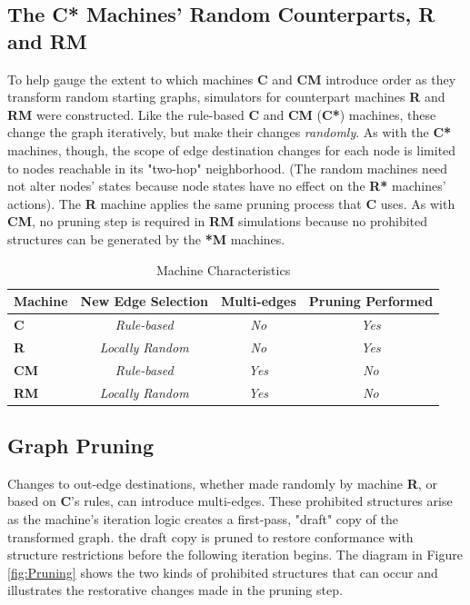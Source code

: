 \documentclass{tufte-handout}
\begin{document}
\subsection{The \textbf{C*} Machines' Random Counterparts, \textbf{R} and \textbf{RM}}

To help gauge the extent to which machines \textbf{C} and \textbf{CM}
introduce order as they transform random starting graphs, simulators for counterpart
machines \textbf{R} and \textbf{RM} were constructed. Like the rule-based \textbf{C} and
\textbf{CM} (\textbf{C*}) machines, these change the graph iteratively, but make their
changes \textit{randomly}.
As with the \textbf{C*} machines, though, the scope of edge destination changes for each node is
limited to nodes reachable in its "two-hop" neighborhood. (The random machines need not alter nodes' states
because node states have no effect on the \textbf{R*} machines' actions).
The \textbf{R} machine applies the same pruning process that \textbf{C} uses. As
with \textbf{CM}, no pruning step is required in \textbf{RM} simulations because
no prohibited structures can be generated by the \textbf{*M} machines.

\begin{table}
\caption{Machine Characteristics}
\centering
\begin{tabular}{lccc}
\toprule
Machine & New Edge Selection & Multi-edges & Pruning Performed \\
\midrule
\textbf{C} & \textit{Rule-based} & \textit{No} & \textit{Yes} \\
\textbf{R} & \textit{Locally Random} & \textit{No} & \textit{Yes} \\
\cmidrule(r){2-4}
\textbf{CM} & \textit{Rule-based} & \textit{Yes} & \textit{No} \\
\textbf{RM} & \textit{Locally Random} & \textit{Yes} & \textit{No} \\
\bottomrule
\end{tabular}
\label{tab:Tab1}
\end{table}
\vspace{3mm}

\subsection{Graph Pruning}

Changes to out-edge destinations, whether made randomly by machine \textbf{R}, or based on \textbf{C}'s
rules, can introduce multi-edges. These prohibited structures
arise as the machine's iteration logic creates a first-pass, "draft" copy of the transformed graph.
the draft copy is pruned to restore conformance with structure restrictions before
the following iteration begins.
The diagram in Figure \ref{fig:Pruning} shows the two kinds of prohibited structures
that can occur and illustrates the restorative changes made in the pruning step.
\end{document}
